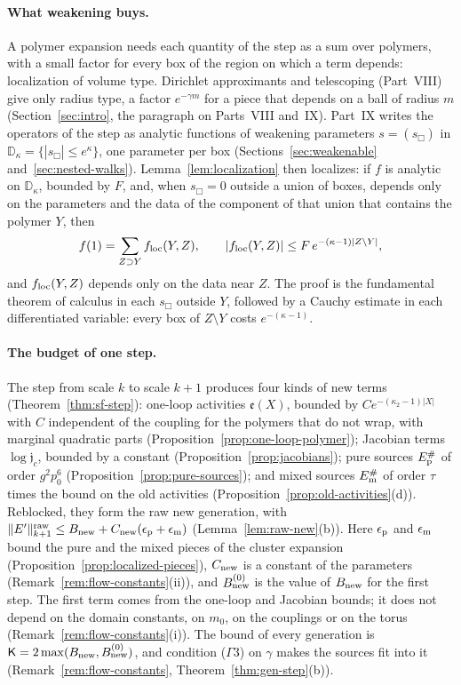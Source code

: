 \paragraph{What weakening buys.} A polymer expansion needs each quantity of the step as a sum over polymers, with a small factor for every box of the region on which a term depends: localization of volume type. Dirichlet approximants and telescoping (Part~VIII) give only radius type, a factor $e^{-\gamma m}$ for a piece that depends on a ball of radius $m$ (Section~\ref{sec:intro}, the paragraph on Parts~VIII and~IX). Part~IX writes the operators of the step as analytic functions of weakening parameters $s=(s_\Box)$ in $\mathbb D_\kappa=\{|s_\Box|\le e^\kappa\}$, one parameter per box (Sections~\ref{sec:weakenable} and~\ref{sec:nested-walks}). Lemma~\ref{lem:localization} then localizes: if $f$ is analytic on $\mathbb D_\kappa$, bounded by $F$, and, when $s_\Box=0$ outside a union of boxes, depends only on the parameters and the data of the component of that union that contains the polymer $Y$, then
\[
f(1)=\sum_{Z\supset Y}f_{\rm loc}(Y,Z),\qquad |f_{\rm loc}(Y,Z)|\le F\,e^{-(\kappa-1)|Z\setminus Y|},
\]
and $f_{\rm loc}(Y,Z)$ depends only on the data near $Z$. The proof is the fundamental theorem of calculus in each $s_\Box$ outside $Y$, followed by a Cauchy estimate in each differentiated variable: every box of $Z\setminus Y$ costs $e^{-(\kappa-1)}$.

\paragraph{The budget of one step.} The step from scale $k$ to scale $k+1$ produces four kinds of new terms (Theorem~\ref{thm:sf-step}): one-loop activities $\mathfrak e(X)$, bounded by $Ce^{-(\kappa_2-1)|X|}$ with $C$ independent of the coupling for the polymers that do not wrap, with marginal quadratic parts (Proposition~\ref{prop:one-loop-polymer}); Jacobian terms $\log\mathfrak j_c$, bounded by a constant (Proposition~\ref{prop:jacobians}); pure sources $E^\#_{\rm p}$ of order $g^2p_0^6$ (Proposition~\ref{prop:pure-sources}); and mixed sources $E^\#_{\rm m}$ of order $\tau$ times the bound on the old activities (Proposition~\ref{prop:old-activities}(d)). Reblocked, they form the raw new generation, with $\|E'\|^{\rm raw}_{k+1}\le B_{\rm new}+C_{\rm new}(\epsilon_{\rm p}+\epsilon_{\rm m})$ (Lemma~\ref{lem:raw-new}(b)). Here $\epsilon_{\rm p}$ and $\epsilon_{\rm m}$ bound the pure and the mixed pieces of the cluster expansion (Proposition~\ref{prop:localized-pieces}), $C_{\rm new}$ is a constant of the parameters (Remark~\ref{rem:flow-constants}(ii)), and $B^{(0)}_{\rm new}$ is the value of $B_{\rm new}$ for the first step. The first term comes from the one-loop and Jacobian bounds; it does not depend on the domain constants, on $m_0$, on the couplings or on the torus (Remark~\ref{rem:flow-constants}(i)). The bound of every generation is $\mathsf K=2\max(B_{\rm new},B^{(0)}_{\rm new})$, and condition ($\Gamma$3) on $\gamma$ makes the sources fit into it (Remark~\ref{rem:flow-constants}, Theorem~\ref{thm:gen-step}(b)).

